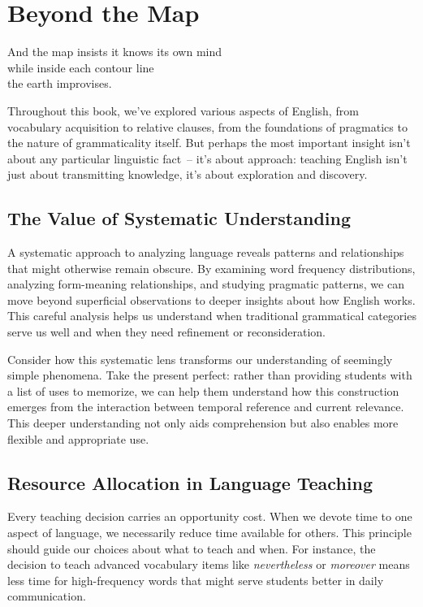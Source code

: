 \chapter{Beyond the Map}

\epigraph{And the map insists it knows its own mind\\
while inside each contour line\\
the earth improvises.}{}

Throughout this book, we've explored various aspects of English, from vocabulary acquisition to relative clauses, from the foundations of pragmatics to the nature of grammaticality itself. But perhaps the most important insight isn't about any particular linguistic fact~-- it's about approach: teaching English isn't just about transmitting knowledge, it's about exploration and discovery.

\section*{The Value of Systematic Understanding}

A systematic approach to analyzing language reveals patterns and relationships that might otherwise remain obscure. By examining word frequency distributions, analyzing form-meaning relationships, and studying pragmatic patterns, we can move beyond superficial observations to deeper insights about how English works. This careful analysis helps us understand when traditional grammatical categories serve us well and when they need refinement or reconsideration.

Consider how this systematic lens transforms our understanding of seemingly simple phenomena. Take the present perfect: rather than providing students with a list of uses to memorize, we can help them understand how this construction emerges from the interaction between temporal reference and current relevance. This deeper understanding not only aids comprehension but also enables more flexible and appropriate use.

\section*{Resource Allocation in Language Teaching}

Every teaching decision carries an opportunity cost. When we devote time to one aspect of language, we necessarily reduce time available for others. This principle should guide our choices about what to teach and when. For instance, the decision to teach advanced vocabulary items like \textit{nevertheless} or \textit{moreover} means less time for high-frequency words that might serve students better in daily communication.

